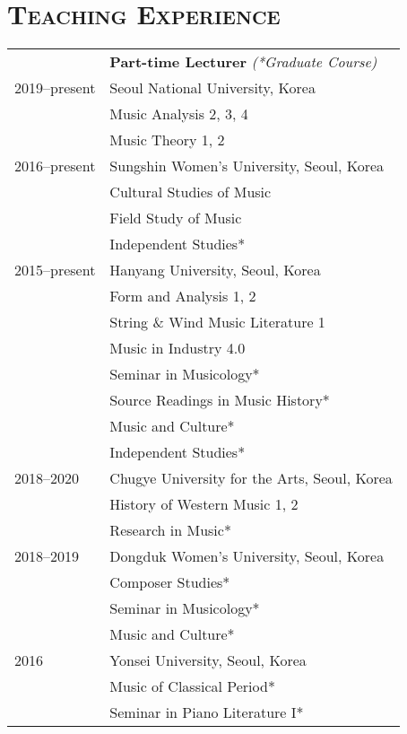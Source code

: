 \documentclass[a4paper,11pt]{article}
\begin{document}
  \vspace{5.0mm}
  
  \section*{\textsc{Teaching Experience}}
  
  \hspace*{-0.25cm}
  \begin{tabular}{p{2.5cm} l}
    & \textbf{Part-time Lecturer} \textit{(*Graduate Course)}\\
    2019–present & Seoul National University, Korea\\
    & Music Analysis 2, 3, 4\\
    & Music Theory 1, 2\\[1mm]
    
    2016–present & Sungshin Women's University, Seoul, Korea\\
    & Cultural Studies of Music\\
    & Field Study of Music\\
    & Independent Studies*\\[1mm]
    
    2015–present & Hanyang University, Seoul, Korea\\
    & Form and Analysis 1, 2\\
    & String \& Wind Music Literature 1\\
    & Music in Industry 4.0\\
    & Seminar in Musicology*\\
    & Source Readings in Music History*\\
    & Music and Culture*\\
    & Independent Studies*\\[1mm]
    
    2018–2020 & Chugye University for the Arts, Seoul, Korea\\
    & History of Western Music 1, 2\\
    & Research in Music*\\[1mm]
    
    2018–2019 & Dongduk Women's University, Seoul, Korea\\
    & Composer Studies*\\
    & Seminar in Musicology*\\
    & Music and Culture*\\[1mm]
    
    2016 & Yonsei University, Seoul, Korea\\
    & Music of Classical Period*\\
    & Seminar in Piano Literature I*\\[1mm]
    

\end{tabular}
\end{document}
